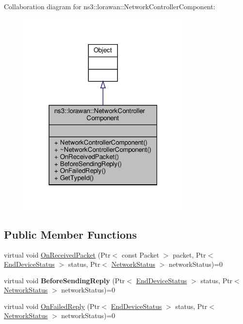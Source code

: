 Collaboration diagram for ns3\+:\+:lorawan\+:\+:Network\+Controller\+Component\+:
\nopagebreak
\begin{figure}[H]
\begin{center}
\leavevmode
\includegraphics[width=247pt]{classns3_1_1lorawan_1_1NetworkControllerComponent__coll__graph}
\end{center}
\end{figure}
\subsection*{Public Member Functions}
\begin{DoxyCompactItemize}
\item 
virtual void \hyperlink{classns3_1_1lorawan_1_1NetworkControllerComponent_a965fb667c3e88703e8cdbcbcd057db6f}{On\+Received\+Packet} (Ptr$<$ const Packet $>$ packet, Ptr$<$ \hyperlink{classns3_1_1lorawan_1_1EndDeviceStatus}{End\+Device\+Status} $>$ status, Ptr$<$ \hyperlink{classns3_1_1lorawan_1_1NetworkStatus}{Network\+Status} $>$ network\+Status)=0
\item 
\mbox{\label{classns3_1_1lorawan_1_1NetworkControllerComponent_a7cb7697dee72c7e1479ef24ca56ff7d2}} 
virtual void {\bfseries Before\+Sending\+Reply} (Ptr$<$ \hyperlink{classns3_1_1lorawan_1_1EndDeviceStatus}{End\+Device\+Status} $>$ status, Ptr$<$ \hyperlink{classns3_1_1lorawan_1_1NetworkStatus}{Network\+Status} $>$ network\+Status)=0
\item 
virtual void \hyperlink{classns3_1_1lorawan_1_1NetworkControllerComponent_aaff757f6ece10a8ef24564006c137d72}{On\+Failed\+Reply} (Ptr$<$ \hyperlink{classns3_1_1lorawan_1_1EndDeviceStatus}{End\+Device\+Status} $>$ status, Ptr$<$ \hyperlink{classns3_1_1lorawan_1_1NetworkStatus}{Network\+Status} $>$ network\+Status)=0
\end{DoxyCompactItemize}
